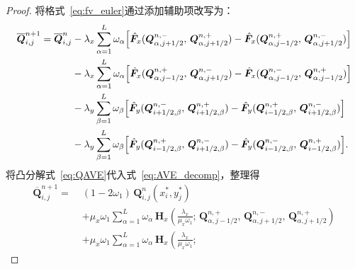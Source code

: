 \documentclass[12pt,a4paper]{article}
\numberwithin{equation}{section}    %
\begin{document}
\begin{proof}
    将格式~\eqref{eq:fv_euler}通过添加辅助项改写为：
    \begin{equation}
        \label{eq:AVE_decomp}
        \begin{aligned}
            \overline{\bm{Q}}_{i,j}^{n+1}
            = \overline{\bm{Q}}_{i,j}^n
            &- \lambda_x \sum_{\alpha=1}^{L} \omega_\alpha
            \Bigl[
            \hat{\bm{F}}_x(\bm{Q}_{\alpha,j+1/2}^{n,-},\,
            \bm{Q}_{\alpha,j+1/2}^{n,+})
            - \hat{\bm{F}}_x(\bm{Q}_{\alpha,j-1/2}^{n,+},\,
            \bm{Q}_{\alpha,j+1/2}^{n,-})
            \Bigr] \\
            &- \lambda_x \sum_{\alpha=1}^{L} \omega_\alpha
            \Bigl[
            \hat{\bm{F}}_x(\bm{Q}_{\alpha,j-1/2}^{n,+},\,
            \bm{Q}_{\alpha,j+1/2}^{n,-})
            - \hat{\bm{F}}_x(\bm{Q}_{\alpha,j-1/2}^{n,-},\,
            \bm{Q}_{\alpha,j-1/2}^{n,+})
            \Bigr] \\
            &- \lambda_y \sum_{\beta=1}^{L} \omega_\beta
            \Bigl[
            \hat{\bm{F}}_y(\bm{Q}_{i+1/2,\beta}^{n,-},\,
            \bm{Q}_{i+1/2,\beta}^{n,+})
            - \hat{\bm{F}}_y(\bm{Q}_{i-1/2,\beta}^{n,+},\,
            \bm{Q}_{i+1/2,\beta}^{n,-})
            \Bigr] \\
            &- \lambda_y \sum_{\beta=1}^{L} \omega_\beta
            \Bigl[
            \hat{\bm{F}}_y(\bm{Q}_{i-1/2,\beta}^{n,+},\,
            \bm{Q}_{i+1/2,\beta}^{n,-})
            - \hat{\bm{F}}_y(\bm{Q}_{i-1/2,\beta}^{n,-},\,
            \bm{Q}_{i-1/2,\beta}^{n,+})
            \Bigr].
        \end{aligned}
    \end{equation}
    将凸分解式~\eqref{eq:QAVE}代入式~\eqref{eq:AVE_decomp}，整理得
    \begin{equation}
        \label{eq:convex_decomp}
        \begin{aligned}
            \overline{\bm{Q}}_{i,j}^{n+1}
            = \;&(1-2\omega_1)\,\bm{Q}_{i,j}^n(x_i^*, y_j^*) \\
            &+ \mu_x \omega_1 \sum_{\alpha=1}^{L} \omega_\alpha\,
            \bm{H}_x\!\left(
            \frac{\lambda_x}{\mu_x\omega_1};\,
            \bm{Q}_{\alpha,j-1/2}^{n,+},\,
            \bm{Q}_{\alpha,j+1/2}^{n,-},\,
            \bm{Q}_{\alpha,j+1/2}^{n,+}
            \right) \\
            &+ \mu_x \omega_1 \sum_{\alpha=1}^{L} \omega_\alpha\,
            \bm{H}_x\!\left(
            \frac{\lambda_x}{\mu_x\omega_1};\,

\end{aligned}
\end{equation}
\end{proof}
\end{document}
